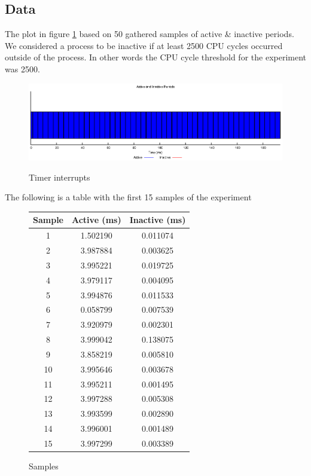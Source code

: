 \documentclass[oneside]{amsart}
\theoremstyle{definition}
\theoremstyle{remark}
\numberwithin{equation}{section}
\begin{document}
\subsection{Data}
The plot in figure \ref{fig:plot} based on 50 gathered samples of active \& inactive periods. We
considered a process to be inactive if at least 2500 CPU cycles occurred outside of the process. In
other words the CPU cycle threshold for the experiment was 2500.

\begin{figure}[h]
    \caption{Timer interrupts}
    \centering
    \includegraphics[scale=1]{A1P1.eps}
    \label{fig:plot}
\end{figure}

\newpage

The following is a table with the first 15 samples of the experiment

\begin{figure}[h]
    \caption{Samples}
    \begin{tabular}{c|c|c}
        Sample & Active (ms) & Inactive (ms) \\
        \hline
        1  & 1.502190 & 0.011074 \\
        2  & 3.987884 & 0.003625 \\
        3  & 3.995221 & 0.019725 \\
        4  & 3.979117 & 0.004095 \\
        5  & 3.994876 & 0.011533 \\
        6  & 0.058799 & 0.007539 \\
        7  & 3.920979 & 0.002301 \\
        8  & 3.999042 & 0.138075 \\
        9  & 3.858219 & 0.005810 \\
        10 & 3.995646 & 0.003678 \\
        11 & 3.995211 & 0.001495 \\
        12 & 3.997288 & 0.005308 \\
        13 & 3.993599 & 0.002890 \\
        14 & 3.996001 & 0.001489 \\
        15 & 3.997299 & 0.003389
    \end{tabular}
    \label{fig:samples}
\end{figure}
\end{document}
